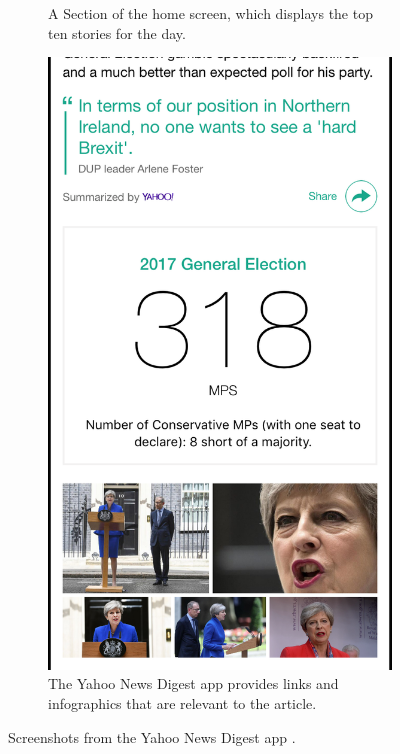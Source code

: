 \documentclass[12pt]{article}
\begin{document}
\begin{figure}[ht!]
\begin{subfigure}[t]{0.3\textwidth}
        \caption{A Section of the home screen, which displays the top ten stories for the day.}
        \label{YNDHome}
    \end{subfigure}
    \qquad
    \begin{subfigure}[t]{0.3\textwidth}
    \includegraphics[width=\textwidth]{YNDInfo.PNG}
   \caption{The Yahoo News Digest app provides links and infographics that are relevant to the article.}
   \label{YNDInfo}
   \end{subfigure}
   \caption[Screenshots from the Yahoo News Digest app]{Screenshots from the Yahoo News Digest app \cite{yahooNewsDigest}.}
\end{figure}
\end{document}
